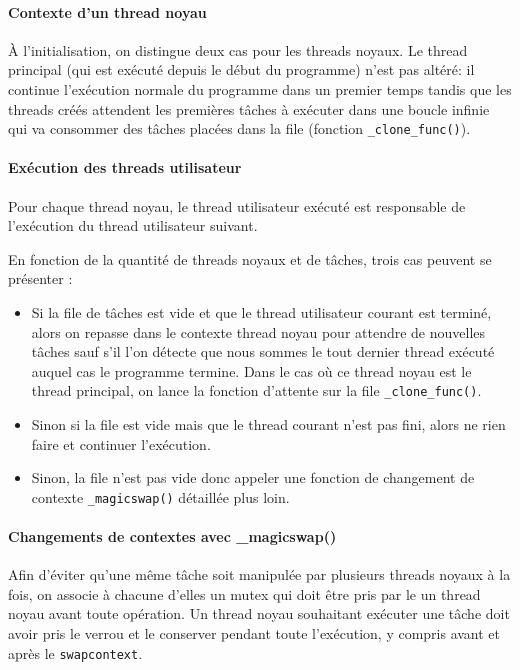 \paragraph{Contexte d'un thread noyau} À l'initialisation, on distingue deux cas pour les threads noyaux. Le thread principal (qui est exécuté depuis le début du programme) n'est pas altéré: il continue l'exécution normale du programme dans un premier temps tandis que les threads créés attendent les premières tâches à exécuter dans une boucle infinie qui va consommer des tâches placées dans la file (fonction \verb!_clone_func()!).

\paragraph{Exécution des threads utilisateur} Pour chaque thread noyau, le thread utilisateur exécuté est responsable de l'exécution du thread utilisateur suivant. 

En fonction de la quantité de threads noyaux et de tâches, trois cas peuvent se présenter :
\begin{itemize}
	\item Si la file de tâches est vide et que le thread utilisateur courant est terminé, alors on repasse dans le contexte thread noyau pour attendre de nouvelles tâches sauf s'il l'on détecte que nous sommes le tout dernier thread exécuté auquel cas le programme termine. Dans le cas où ce thread noyau est le thread principal, on lance la fonction d'attente sur la file \verb!_clone_func()!.
	\item Sinon si la file est vide mais que le thread courant n'est pas fini, alors ne rien faire et continuer l'exécution.
	\item Sinon, la file n'est pas vide donc appeler une fonction de changement de contexte \verb!_magicswap()! détaillée plus loin.
\end{itemize}

\paragraph{Changements de contextes avec \_magicswap()} Afin d'éviter qu'une même tâche soit manipulée par plusieurs threads noyaux à la fois, on associe à chacune d'elles un mutex qui doit être pris par le un thread noyau avant toute opération. Un thread noyau souhaitant exécuter une tâche doit avoir pris le verrou et le conserver pendant toute l'exécution, y compris avant et après le \verb!swapcontext!.

